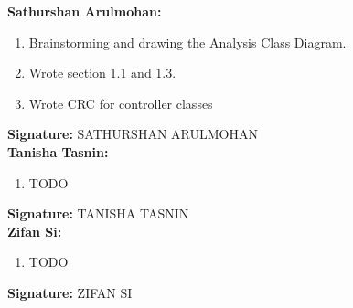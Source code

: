 \documentclass[]{article}
\begin{document}
\textbf{Sathurshan Arulmohan:}
\begin{enumerate}
	\item Brainstorming and drawing the Analysis Class Diagram.
	\item Wrote section 1.1 and 1.3.
	\item Wrote CRC for controller classes
\end{enumerate}

\textbf{Signature:} SATHURSHAN ARULMOHAN \\

\textbf{Tanisha Tasnin:}
\begin{enumerate}
	\item TODO
\end{enumerate}

\textbf{Signature:} TANISHA TASNIN \\

\textbf{Zifan Si:}
\begin{enumerate}
	\item TODO
\end{enumerate}

\textbf{Signature:} ZIFAN SI  \\
\end{document}
